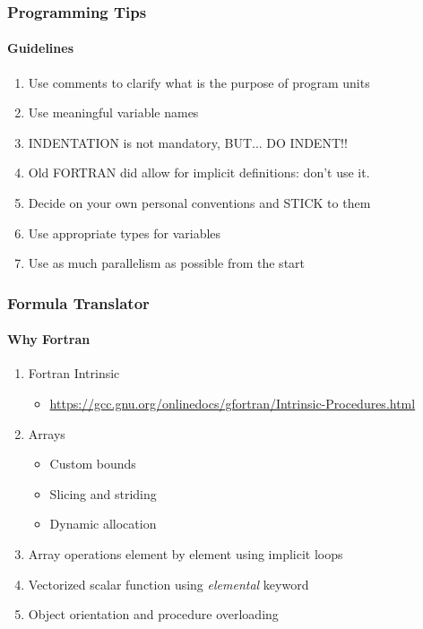 \documentclass[unknownkeysallowed, 10pt, a4 paper, handout]{beamer}
\begin{document}
\begin{frame}[fragile=singleslide]
  \frametitle{Programming Tips}
  \framesubtitle{Guidelines}

  \begin{enumerate}
    \item Use comments to clarify what is the purpose of program units
    \item Use meaningful variable names
    \item INDENTATION is not mandatory, BUT... DO INDENT!!
    \item Old FORTRAN did allow for implicit definitions: don't use it.
    \item Decide on your own personal conventions and STICK to them
    \item Use appropriate types for variables
    \item Use as much parallelism as possible from the start
  \end{enumerate}
\end{frame}


\begin{frame}[fragile=singleslide]
  \frametitle{Formula Translator}
  \framesubtitle{Why Fortran}

  \begin{enumerate}
    \item Fortran Intrinsic
      \begin{itemize}
        \item \small{\url{https://gcc.gnu.org/onlinedocs/gfortran/Intrinsic-Procedures.html}}
      \end{itemize}
    \item Arrays
      \begin{itemize}
        \item Custom bounds
        \item Slicing and striding
        \item Dynamic allocation
      \end{itemize}
    \item Array operations element by element using implicit loops
    \item Vectorized scalar function using \emph{elemental} keyword
    \item Object orientation and procedure overloading
  \end{enumerate}
\end{frame}
\end{document}
